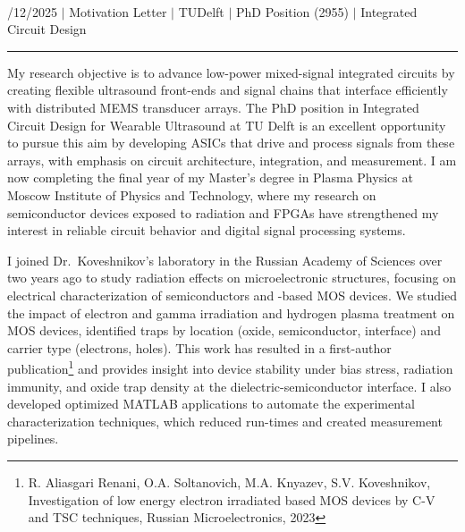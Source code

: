 \documentclass[a4paper,12pt]{article}
\begin{document}
\begin{center}
  {\Huge \scshape {\fontsize{25}{30}\selectfont{Reza}} {\fontsize{25}{30}}} \\ 
  {\fontsize{12}{12}/12/2025} $|$
  {\fontsize{12}{12}\selectfont Motivation Letter} $|$
  {\fontsize{12}{12}\selectfont TUDelft} $|$
  {\fontsize{12}{12}\selectfont PhD Position (2955)} $|$
  {\fontsize{12}{12}\selectfont Integrated Circuit Design}
\end{center}

\vspace{-20pt}
\noindent\rule{\textwidth}{0.5pt}

My research objective is to advance low-power mixed-signal integrated circuits by creating flexible ultrasound front-ends and signal chains that interface efficiently with distributed MEMS transducer arrays. The PhD position in Integrated Circuit Design for Wearable Ultrasound at TU Delft is an excellent opportunity to pursue this aim by developing ASICs that drive and process signals from these arrays, with emphasis on circuit architecture, integration, and measurement. I am now completing the final year of my Master's degree in Plasma Physics at Moscow Institute of Physics and Technology, where my research on semiconductor devices exposed to radiation and FPGAs have strengthened my interest in reliable circuit behavior and digital signal processing systems. 

\vspace{10pt}
I joined Dr.\ Koveshnikov's laboratory in the Russian Academy of Sciences over two years ago to study radiation effects on microelectronic structures, focusing on electrical characterization of semiconductors and -based MOS devices. We studied the impact of electron and gamma irradiation and hydrogen plasma treatment on MOS devices, identified traps by location (oxide, semiconductor, interface) and carrier type (electrons, holes). This work has resulted in a first-author publication\footnote{R. Aliasgari Renani, O.A. Soltanovich, M.A. Knyazev, S.V. Koveshnikov, Investigation of low energy electron irradiated  based MOS devices by C-V and TSC techniques, Russian Microelectronics, 2023} and provides insight into device stability under bias stress, radiation immunity, and oxide trap density at the dielectric-semiconductor interface. I also developed optimized MATLAB applications to automate the experimental characterization techniques, which reduced run-times and created measurement pipelines. 
\end{document}
